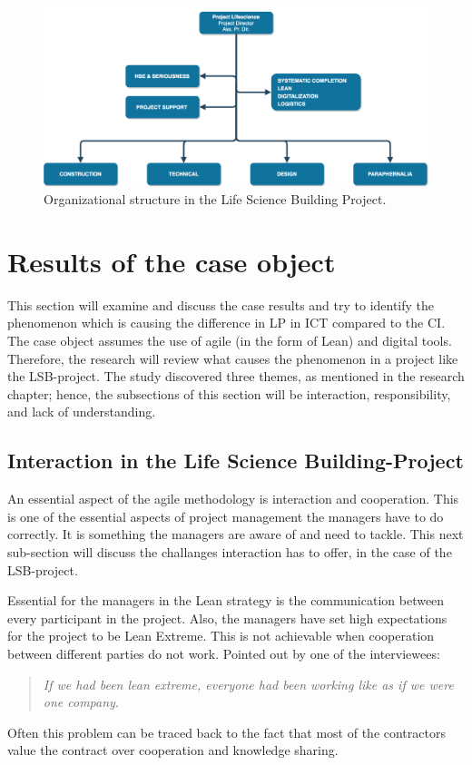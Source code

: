 \begin{figure}
    \centering
    \includegraphics[width=\textwidth]{fig/lvb_diagram.png}
    \caption{Organizational structure in the Life Science Building Project.}
    \label{fig:project_structure}
\end{figure}

\section{Results of the case object}
This section will examine and discuss the case results and try to identify the phenomenon which is causing the difference in LP in ICT compared to the CI. The case object assumes the use of agile (in the form of Lean) and digital tools. Therefore, the research will review what causes the phenomenon in a project like the LSB-project. The study discovered three themes, as mentioned in the research chapter; hence, the subsections of this section will be interaction, responsibility, and lack of understanding.

\subsection{Interaction in the Life Science Building-Project}
An essential aspect of the agile methodology is interaction and cooperation. This is one of the essential aspects of project management the managers have to do correctly. It is something the managers are aware of and need to tackle. This next sub-section will discuss the challanges interaction has to offer, in the case of the LSB-project.

Essential for the managers in the Lean strategy is the communication between every participant in the project. Also, the managers have set high expectations for the project to be Lean Extreme. This is not achievable when cooperation between different parties do not work. Pointed out by one of the interviewees:
\begin{quote}
    \textit{If we had been lean extreme, everyone had been working like as if we were one company.}
\end{quote}
Often this problem can be traced back to the fact that most of the contractors value the contract over cooperation and knowledge sharing. 

